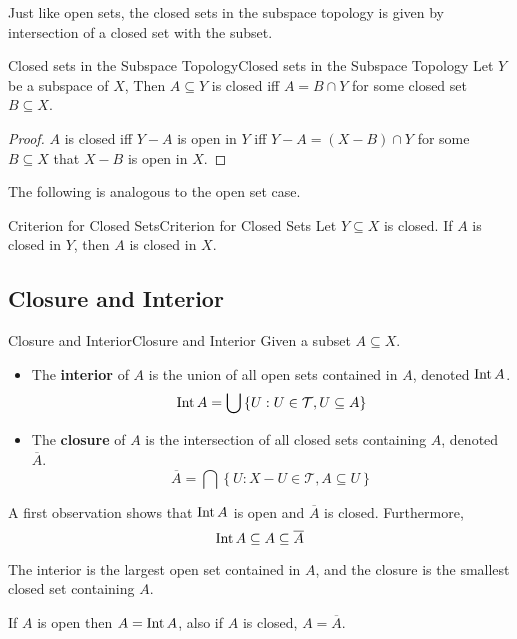 \documentclass[../main.tex]{subfiles}
\begin{document}
Just like open sets, the closed sets in the subspace topology is given by intersection of a closed set with the subset.

\begin{theorem}{Closed sets in the Subspace Topology}{Closed sets in the Subspace Topology}
Let $Y$ be a subspace of $X$, Then $A \subseteq Y$ is closed iff $A = B \cap Y$ for some closed set $B \subseteq X$.
\end{theorem}
\begin{proof}
 $A$ is closed iff $Y-A$ is open in $Y$ iff $Y-A = (X-B)\cap Y$ for some $B \subseteq X$ that $X-B$ is open in $X$.
\end{proof}

The following is analogous to the open set case.

\begin{theorem}{Criterion for Closed Sets}{Criterion for Closed Sets}
Let $Y \subseteq X$ is closed. If $A$ is closed in $Y$, then $A$ is closed in $X$.
\end{theorem}

\subsection{Closure and Interior}
\begin{definition}{Closure and Interior}{Closure and Interior}
Given a subset $A \subseteq X$.
\begin{itemize}
\item The \textbf{interior} of $A$ is the union of all open sets contained in $A$, denoted $\operatorname{Int} A$.
	\begin{equation*}
	\operatorname{Int} A = \bigcup \left\{ U: U\in \mathcal{T}, U \subseteq A \right\} 
	\end{equation*}
\item The \textbf{closure} of $A$ is the intersection of all closed sets containing $A$, denoted $\overline{A}$.
	\begin{equation*}
	\overline{A} = \bigcap \left\{ U: X-U\in \mathcal{T}, A \subseteq U\right\} 
	\end{equation*}
\end{itemize}
\end{definition}

A first observation shows that $\operatorname{Int} A$ is open and $\overline{A}$ is closed. Furthermore,
\begin{equation*}
\operatorname{Int} A \subseteq A \subseteq \overline{A}
\end{equation*}
\begin{remark}
The interior is the largest open set contained in $A$, and the closure is  the smallest closed set containing $A$.

If $A$ is open then $A = \operatorname{Int} A$, also if $A$ is closed, $A = \overline{A}$.
\end{remark}
\end{document}
